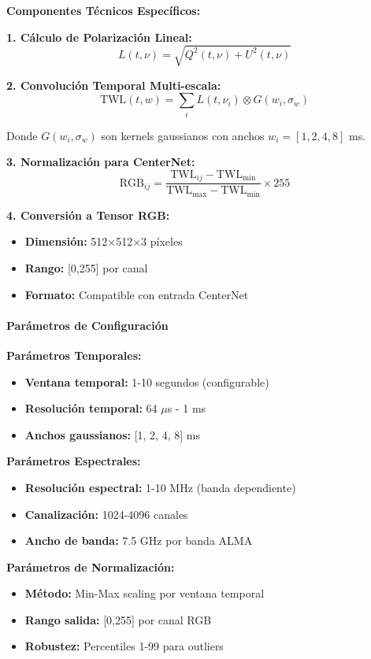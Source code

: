 \textbf{Componentes Técnicos Específicos:}

\textbf{1. Cálculo de Polarización Lineal:}
\[
L(t,\nu) = \sqrt{Q^2(t,\nu) + U^2(t,\nu)}
\]

\textbf{2. Convolución Temporal Multi-escala:}
\[
\text{TWL}(t,w) = \sum_{i} L(t,\nu_i) \otimes G(w_i, \sigma_w)
\]

Donde $G(w_i, \sigma_w)$ son kernels gaussianos con anchos $w_i = [1,2,4,8]$ ms.

\textbf{3. Normalización para CenterNet:}
\[
\text{RGB}_{ij} = \frac{\text{TWL}_{ij} - \text{TWL}_{\min}}{\text{TWL}_{\max} - \text{TWL}_{\min}} \times 255
\]

\textbf{4. Conversión a Tensor RGB:}
\begin{itemize}
\item \textbf{Dimensión:} 512×512×3 píxeles
\item \textbf{Rango:} [0,255] por canal
\item \textbf{Formato:} Compatible con entrada CenterNet
\end{itemize}

\paragraph{Parámetros de Configuración}

\textbf{Parámetros Temporales:}
\begin{itemize}
\item \textbf{Ventana temporal:} 1-10 segundos (configurable)
\item \textbf{Resolución temporal:} 64 $\mu$s - 1 ms
\item \textbf{Anchos gaussianos:} [1, 2, 4, 8] ms
\end{itemize}

\textbf{Parámetros Espectrales:}
\begin{itemize}
\item \textbf{Resolución espectral:} 1-10 MHz (banda dependiente)
\item \textbf{Canalización:} 1024-4096 canales
\item \textbf{Ancho de banda:} 7.5 GHz por banda ALMA
\end{itemize}

\textbf{Parámetros de Normalización:}
\begin{itemize}
\item \textbf{Método:} Min-Max scaling por ventana temporal
\item \textbf{Rango salida:} [0,255] por canal RGB
\item \textbf{Robustez:} Percentiles 1-99 para outliers
\end{itemize}

